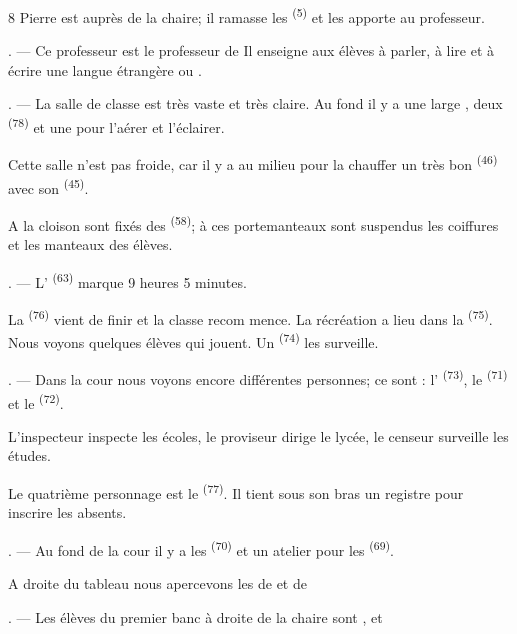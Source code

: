 \begin{VUpage}[10]{8}
\VUblancAlinea
Pierre est auprès de la chaire; il ramasse les\nl
{}\textsuperscript{(5)} et les apporte au professeur.

. --- Ce professeur est le professeur de \nl
{} Il enseigne aux élèves à parler, à lire et\nl
à écrire une langue étrangère \nl
{} ou .

. --- La salle de classe est très vaste et très claire.\nl
Au fond il y a une large , deux  \textsuperscript{(78)}\nl
et une  pour l'aérer et l'éclairer.

\VUblancAlinea
Cette salle n'est pas froide, car il y a au milieu pour\nl
la chauffer un très bon \textsuperscript{(46)} avec son \textsuperscript{(45)}.

\VUblancAlinea
A la cloison sont fixés des \textsuperscript{(58)};\nl
à ces portemanteaux sont suspendus les coiffures\nl
et les manteaux des élèves.

. --- L' \textsuperscript{(63)} marque 9 heures 5 minutes.

La \textsuperscript{(76)} vient de finir et la classe recom\cc
mence. La récréation a lieu dans la \textsuperscript{(75)}. Nous\nl
voyons quelques élèves qui jouent. Un \nl
{}\textsuperscript{(74)} les surveille.

. --- Dans la cour nous voyons encore différentes\nl
personnes; ce sont : l' \textsuperscript{(73)}, le \cc
{} \textsuperscript{(71)} et le  \textsuperscript{(72)}.

\VUblancAlinea
L'inspecteur inspecte les écoles, le proviseur dirige\nl
le lycée, le censeur surveille les études.

\VUblancAlinea
Le quatrième personnage est le \textsuperscript{(77)}. Il\nl
tient sous son bras un registre pour inscrire les\nl
absents.

. --- Au fond de la cour il y a les \nl
{}\textsuperscript{(70)} et un atelier pour les \nl
{}\textsuperscript{(69)}.

\VUblancAlinea
A droite du tableau nous apercevons les \nl
de  et de 

\VUsaut{5.4mm}
\VUsaut{4.0mm}

. --- Les élèves du premier banc à droite de la\nl
chaire sont ,  et 
\end{VUpage}


